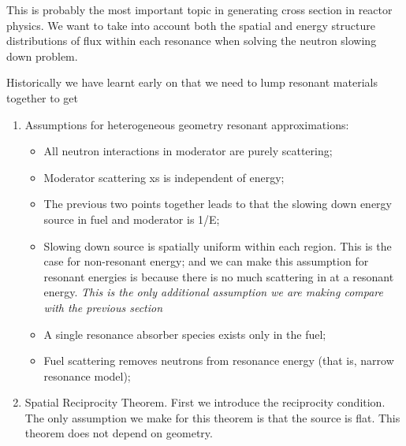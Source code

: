 \documentclass{school-22.211-notes}
\date{March  5, 2012}
\begin{document}
\maketitle


 \label{heterogeneous-geo}
This is probably the most important topic in generating cross section in reactor physics. We want to take into account both the spatial and energy structure distributions of flux within each resonance when solving the neutron slowing down problem. 

Historically we have learnt early on that we need to lump resonant materials together to get 

\begin{enumerate}
\item Assumptions for heterogeneous geometry resonant approximations:
\begin{itemize}
\item All neutron interactions in moderator are purely scattering;
\item Moderator scattering xs is independent of energy;
\item The previous two points together leads to that the slowing down energy source in fuel and moderator is 1/E;
\item Slowing down source is spatially uniform within each region. This is the case for non-resonant energy; and we can make this assumption for resonant energies is because there is no much scattering in at a resonant energy. \textit{This is the only additional assumption we are making compare with the previous section}
\item A single resonance absorber species exists only in the fuel;
\item Fuel scattering removes neutrons from resonance energy (that is, narrow resonance model); 
\end{itemize}

\item Spatial Reciprocity Theorem. First we introduce the reciprocity condition. The only assumption we make for this theorem is that the source is flat. This theorem does not depend on geometry. 


\end{enumerate}
\end{document}
